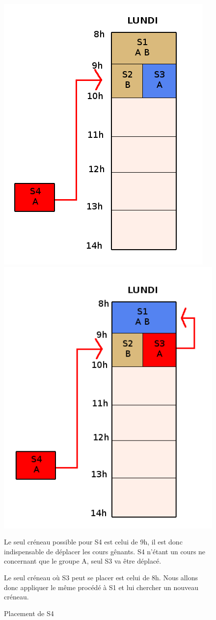 \documentclass[12pt,a4paper,openany]{memoir}
\begin{document}
\begin{figure}[H]
    \includegraphics[scale=0.3]{img/Schema/Etape_4.png}\hfill
    \includegraphics[scale=0.3]{img/Schema/Etape_5.png}
    \caption{Placement de S4} \medbreak
    \par Le seul créneau possible pour S4 est celui de 9h, il est donc indispensable de déplacer les cours gênants. S4 n'étant un cours ne concernant que le groupe A, seul S3 va être déplacé.
    \par Le seul créneau où S3 peut se placer est celui de 8h. Nous allons donc appliquer le même procédé à S1 et lui chercher un nouveau créneau.
\end{figure}
\end{document}
